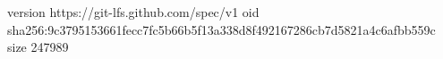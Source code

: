 version https://git-lfs.github.com/spec/v1
oid sha256:9c3795153661fecc7fc5b66b5f13a338d8f492167286cb7d5821a4c6afbb559c
size 247989
